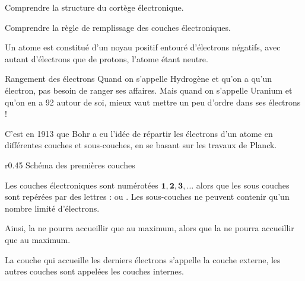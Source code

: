 \sndEnTeteTrois

\vspace*{-36pt}


\vspace*{-8pt}
\begin{objectifs}
  \item Comprendre la structure du cortège électronique.
  \item Comprendre la règle de remplissage des couches électroniques.
\end{objectifs}

\begin{contexte}
  Un atome est constitué d'un noyau positif entouré d'électrons négatifs, avec autant d'électrons que de protons, l'atome étant neutre.
  
\end{contexte}


\begin{doc}{Rangement des électrons}
  Quand on s'appelle Hydrogène et qu'on a qu'un électron, pas besoin de ranger ses affaires.
  Mais quand on s'appelle Uranium et qu'on en a 92 autour de soi, mieux vaut mettre un peu d'ordre dans ses électrons !
  
  C'est en 1913 que Bohr a eu l'idée de répartir les électrons d'un atome en différentes couches et sous-couches, en se basant sur les travaux de Planck.
  
  \begin{wrapfigure}{r}{0.45\linewidth}
    \centering
    \vspace*{-16pt}
    {\small Schéma des premières couches}
  \end{wrapfigure}
  
  Les couches électroniques sont numérotées $\mathbf{1, 2, 3,\ldots}$ alors que les sous couches sont repérées par des lettres :  ou .
  Les sous-couches ne peuvent contenir qu'un nombre limité d'électrons.
  
  Ainsi, la  ne pourra accueillir que  au maximum, alors que la  ne pourra accueillir que  au maximum.
  
  La couche qui accueille les derniers électrons s'appelle la couche externe, les autres couches sont appelées les couches internes.
\end{doc}

